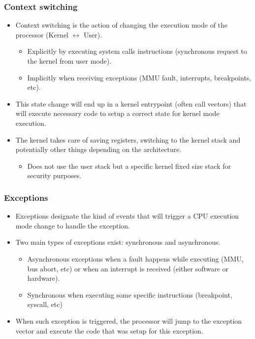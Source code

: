 \begin{frame}
  \frametitle{Context switching}
  \begin{itemize}
    \item Context switching is the action of changing the execution mode of the
          processor (Kernel $\leftrightarrow$ User).
    \begin{itemize}
      \item Explicitly by executing system calls instructions (synchronous
            request to the kernel from user mode).
      \item Implicitly when receiving exceptions (MMU fault, interrupts,
            breakpoints, etc).
    \end{itemize}
    \item This state change will end up in a kernel entrypoint (often call vectors)
          that will execute necessary code to setup a correct state for kernel
          mode execution.
    \item The kernel takes care of saving registers, switching to the kernel
          stack and potentially other things depending on the architecture.
    \begin{itemize}
      \item Does not use the user stack but a specific kernel fixed size stack
            for security purposes.
    \end{itemize}
  \end{itemize}
\end{frame}

\begin{frame}
  \frametitle{Exceptions}
  \begin{itemize}
    \item Exceptions designate the kind of events that will trigger a CPU
          execution mode change to handle the exception.
    \item Two main types of exceptions exist: synchronous and asynchronous.
    \begin{itemize}
      \item Asynchronous exceptions when a fault happens while executing (MMU,
            bus abort, etc) or when an interrupt is received (either software
            or hardware).
      \item Synchronous when executing some specific instructions (breakpoint,
            syscall, etc)
    \end{itemize}
    \item When such exception is triggered, the processor will jump to the
          exception vector and execute the code that was setup for this
          exception.
  \end{itemize}
\end{frame}

